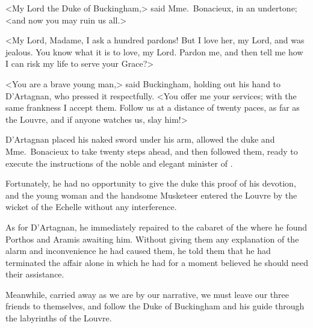 <My Lord the Duke of Buckingham,> said Mme.~Bonacieux, in an undertone; <and now you may ruin us all.> 

<My Lord, Madame, I ask a hundred pardons! But I love her, my Lord, and was jealous. You know what it is to love, my Lord. Pardon me, and then tell me how I can risk my life to serve your Grace?> 

<You are a brave young man,> said Buckingham, holding out his hand to D'Artagnan, who pressed it respectfully. <You offer me your services; with the same frankness I accept them. Follow us at a distance of twenty paces, as far as the Louvre, and if anyone watches us, slay him!> 

D'Artagnan placed his naked sword under his arm, allowed the duke and Mme.~Bonacieux to take twenty steps ahead, and then followed them, ready to execute the instructions of the noble and elegant minister of . 

Fortunately, he had no opportunity to give the duke this proof of his devotion, and the young woman and the handsome Musketeer entered the Louvre by the wicket of the Echelle without any interference. 

As for D'Artagnan, he immediately repaired to the cabaret of the  where he found Porthos and Aramis awaiting him. Without giving them any explanation of the alarm and inconvenience he had caused them, he told them that he had terminated the affair alone in which he had for a moment believed he should need their assistance. 

Meanwhile, carried away as we are by our narrative, we must leave our three friends to themselves, and follow the Duke of Buckingham and his guide through the labyrinths of the Louvre. 